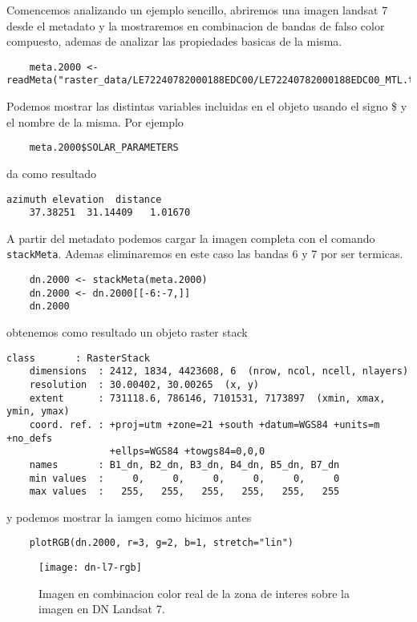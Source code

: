 \begin{exa}
   Comencemos analizando un ejemplo sencillo, abriremos una imagen landsat 7 
    desde el metadato y la mostraremos en combinacion de bandas de falso color
    compuesto, ademas de analizar las propiedades basicas de la misma.
    \begin{lstlisting}
    meta.2000 <- readMeta("raster_data/LE72240782000188EDC00/LE72240782000188EDC00_MTL.txt")
    \end{lstlisting}
    Podemos mostrar las distintas variables incluidas en el objeto usando el
    signo \$ y el nombre de la misma. Por ejemplo
    \begin{lstlisting}
    meta.2000$SOLAR_PARAMETERS
    \end{lstlisting}
    da como resultado
    \begin{Verbatim}[fontsize=\small]
     azimuth elevation  distance 
    37.38251  31.14409   1.01670 
    \end{Verbatim}
    A partir del metadato podemos cargar la imagen completa con el comando
    \texttt{stackMeta}. Ademas eliminaremos en este caso las bandas 6 y 7 por
    ser termicas.
    \begin{lstlisting}
    dn.2000 <- stackMeta(meta.2000)
    dn.2000 <- dn.2000[[-6:-7,]]
    dn.2000
    \end{lstlisting}
    obtenemos como resultado un objeto raster stack
    \begin{Verbatim}[fontsize=\small]
    class       : RasterStack 
    dimensions  : 2412, 1834, 4423608, 6  (nrow, ncol, ncell, nlayers)
    resolution  : 30.00402, 30.00265  (x, y)
    extent      : 731118.6, 786146, 7101531, 7173897  (xmin, xmax, ymin, ymax)
    coord. ref. : +proj=utm +zone=21 +south +datum=WGS84 +units=m +no_defs
                  +ellps=WGS84 +towgs84=0,0,0 
    names       : B1_dn, B2_dn, B3_dn, B4_dn, B5_dn, B7_dn 
    min values  :     0,     0,     0,     0,     0,     0 
    max values  :   255,   255,   255,   255,   255,   255 
    \end{Verbatim}
    y podemos mostrar la iamgen como hicimos antes
    \begin{lstlisting}
    plotRGB(dn.2000, r=3, g=2, b=1, stretch="lin")
    \end{lstlisting}

     \begin{figure}
     \begin{center}
         \texttt{[image: dn-l7-rgb]}
     \end{center}
     \caption{Imagen en combinacion color real de la zona de interes sobre la
         imagen en DN Landsat 7.}
     \label{fig:dn-l7-rgb}
     \end{figure}
\end{exa}

